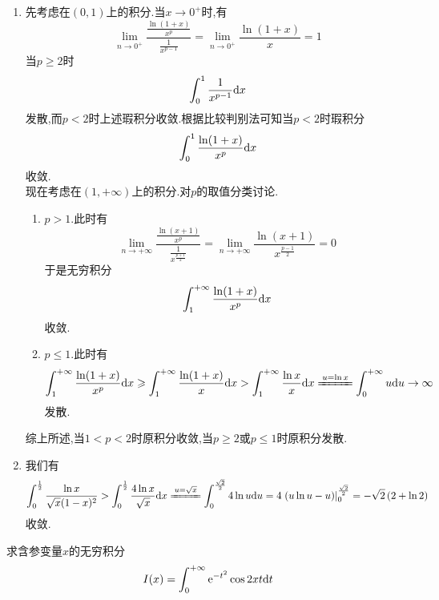 \documentclass{ctexart}
\begin{document}
\begin{solution}
    \begin{enumerate}[label=\tbf{(\arabic*)},topsep=0pt,parsep=0pt,itemsep=0pt,partopsep=0pt]
        \item 先考虑在$(0,1)$上的积分.当$x\to0^+$时,有
            \[\lim_{n\to0^+}\dfrac{\frac{\ln(1+x)}{x^p}}{\frac{1}{x^{p-1}}}
            =\lim_{n\to0^+}\dfrac{\ln(1+x)}{x}=1\]
            当$p\geqslant 2$时
            \[\int_0^1\dfrac{1}{x^{p-1}}\mathrm{d} x\]
            发散,而$p<2$时上述瑕积分收敛.根据比较判别法可知当$p<2$时瑕积分
            \[\int_0^1\dfrac{\ln(1+x)}{x^p}\mathrm{d} x\]
            收敛.\\
            现在考虑在$(1,+\infty)$上的积分.对$p$的取值分类讨论.
            \begin{enumerate}[label=\tbf{\roman*.},topsep=0pt,parsep=0pt,itemsep=0pt,partopsep=0pt,leftmargin=*]
                \item $p>1$.此时有
                    \[\lim_{n\to+\infty}\dfrac{\frac{\ln(x+1)}{x^p}}{\frac{1}{x^{\frac{p+1}{2}}}}
                    =\lim_{n\to+\infty}\dfrac{\ln(x+1)}{x^{\frac{p-1}{2}}}=0\]
                    于是无穷积分
                    \[\int_1^{+\infty}\dfrac{\ln(1+x)}{x^p}\mathrm{d} x\]
                    收敛.
                \item $p\leqslant1$.此时有
                    \[\int_1^{+\infty}\dfrac{\ln(1+x)}{x^p}\di x
                    \geqslant\int_1^{+\infty}\dfrac{\ln(1+x)}{x}\di x
                    >\int_1^{+\infty}\dfrac{\ln x}{x}\di x
                    \xlongequal{u=\ln x}\int_0^{+\infty}u\di u\to\infty\]
                    发散.
            \end{enumerate}
            综上所述,当$1<p<2$时原积分收敛,当$p\geqslant 2$或$p\leqslant 1$时原积分发散.
        \item 我们有
            \[\int_0^{\frac12}\dfrac{\ln x}{\sqrt{x}(1-x)^2}
            >\int_0^{\frac12}\dfrac{4\ln x}{\sqrt{x}}\di x
            \xlongequal{u=\sqrt{x}}\int_0^{\frac{\sqrt2}{2}}4\ln u\di u
            =4\left.\left(u\ln u-u\right)\right|_0^{\frac{\sqrt{2}}{2}}=-\sqrt{2}\left(2+\ln 2\right)\]
            收敛.
    \end{enumerate}
\end{solution}
\begin{problem}[7.(10\songti{分})]
    求含参变量$x$的无穷积分
    \[I(x)=\int_0^{+\infty}\mathrm{e}^{-t^2}\cos 2xt\mathrm{d} t\]
     
\end{problem}
\end{document}
